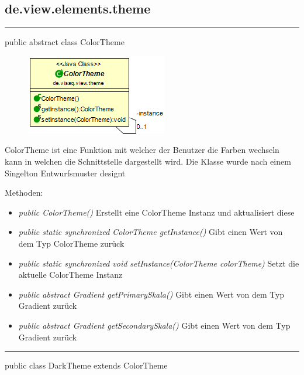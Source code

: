 \subsection{de.view.elements.theme}

\rule{\textwidth}{0.4pt} 
public abstract class ColorTheme

\begin{minipage}{0.3\textwidth}
    \begin{figure}[H]
        \includegraphics[scale = 0.5]{media/frontend/view/de.view.elements.theme/ColorTheme_Class.png}
    \end{figure}
    \end{minipage} \hfill
    \begin{minipage}{0.6\textwidth}
ColorTheme ist eine Funktion mit welcher der Benutzer die Farben wechseln kann in welchen die Schnittstelle dargestellt wird. Die Klasse wurde nach einem Singelton Entwurfsmuster designt
\end{minipage} 

Methoden:
\begin{itemize} 
    \item \emph{public ColorTheme()} Erstellt eine ColorTheme Instanz und aktualisiert diese
    \item \emph{public static synchronized ColorTheme getInstance()} Gibt einen Wert von dem Typ ColorTheme zurück
    \item \emph{public static synchronized void setInstance(ColorTheme colorTheme)} Setzt die aktuelle ColorTheme Instanz   
    \item \emph{public abstract Gradient getPrimarySkala()} Gibt einen Wert von dem Typ Gradient zurück
    \item \emph{public abstract Gradient getSecondarySkala()}  Gibt einen Wert von dem Typ Gradient zurück
\end{itemize}

\rule{\textwidth}{0.4pt} 
public class DarkTheme extends ColorTheme

